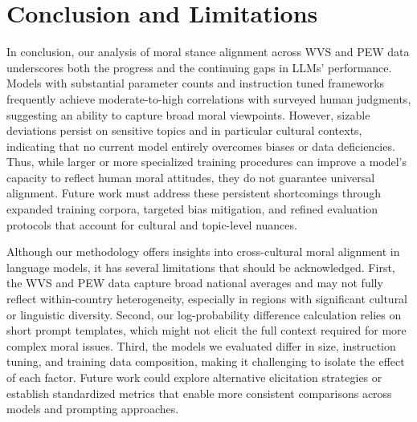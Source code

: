 \documentclass[runningheads]{llncs}
\begin{document}
\section{Conclusion and Limitations}
In conclusion, our analysis of moral stance alignment across WVS and PEW data underscores both the progress and the continuing gaps in LLMs' performance. Models with substantial parameter counts and instruction tuned frameworks frequently achieve moderate-to-high correlations with surveyed human judgments, suggesting an ability to capture broad moral viewpoints. However, sizable deviations persist on sensitive topics and in particular cultural contexts, indicating that no current model entirely overcomes biases or data deficiencies. Thus, while larger or more specialized training procedures can improve a model's capacity to reflect human moral attitudes, they do not guarantee universal alignment. Future work must address these persistent shortcomings through expanded training corpora, targeted bias mitigation, and refined evaluation protocols that account for cultural and topic-level nuances.


Although our methodology offers insights into cross-cultural moral alignment in language models, it has several limitations that should be acknowledged. First, the WVS and PEW data capture broad national averages and may not fully reflect within-country heterogeneity, especially in regions with significant cultural or linguistic diversity. Second, our log-probability difference calculation relies on short prompt templates, which might not elicit the full context required for more complex moral issues. Third, the models we evaluated differ in size, instruction tuning, and training data composition, making it challenging to isolate the effect of each factor. Future work could explore alternative elicitation strategies or establish standardized metrics that enable more consistent comparisons across models and prompting approaches.

\end{document}
